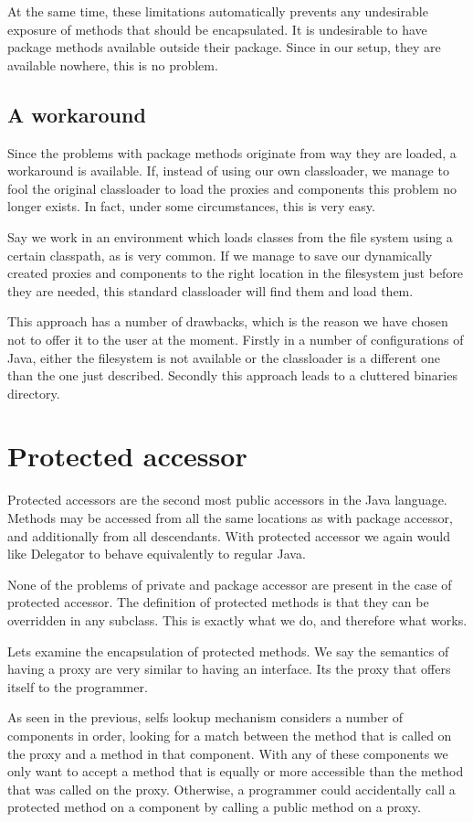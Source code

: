 \documentclass[a4paper,12pt]{book}
\begin{document}
At the same time, these limitations automatically prevents any undesirable exposure of methods that should be encapsulated. It is undesirable to have package methods available outside their package. Since in our setup, they are available nowhere, this is no problem.

\subsection*{A workaround}
Since the problems with package methods originate from way they are loaded, a workaround is available. If, instead of using our own classloader, we manage to fool the original classloader to load the proxies and components this problem no longer exists. In fact, under some circumstances, this is very easy.

Say we work in an environment which loads classes from the file system using a certain classpath, as is very common. If we manage to save our dynamically created proxies and components to the right location in the filesystem just before they are needed, this standard classloader will find them and load them.

This approach has a number of drawbacks, which is the reason we have chosen not to offer it to the user at the moment. Firstly in a number of configurations of Java, either the filesystem is not available or the classloader is a different one than the one just described. Secondly this approach leads to a cluttered binaries directory. 

\section*{Protected accessor}
Protected accessors are the second most public accessors in the Java language. Methods may be accessed from all the same locations as with package accessor, and additionally from all descendants. With protected accessor we again would like Delegator to behave equivalently to regular Java.

None of the problems of private and package accessor are present in the case of protected accessor. The definition of protected methods is that they can be overridden in any subclass. This is exactly what we do, and therefore what works.

Lets examine the encapsulation of protected methods. We say the semantics of having a proxy are very similar to having an interface. Its the proxy that offers itself to the programmer.

As seen in the previous, selfs lookup mechanism considers a number of components in order, looking for a match between the method that is called on the proxy and a method in that component. With any of these components we only want to accept a method that is equally or more accessible than the method that was called on the proxy. Otherwise, a programmer could accidentally call a protected method on a component by calling a public method on a proxy.
\end{document}
